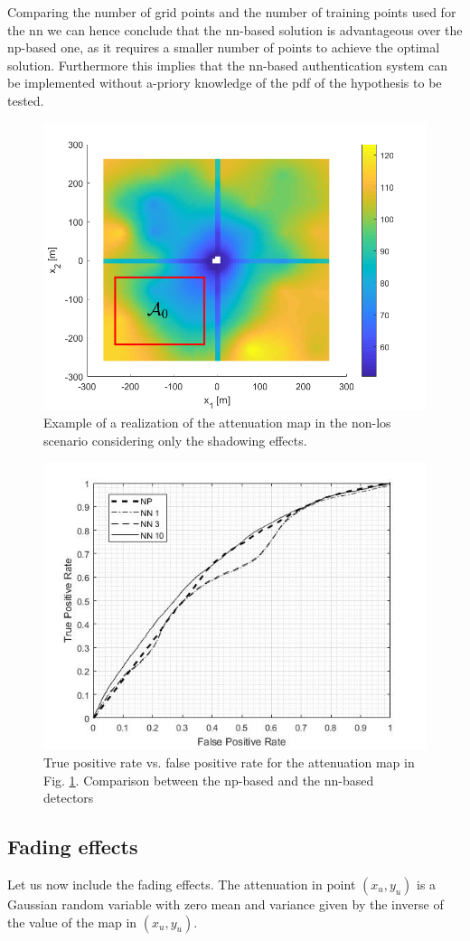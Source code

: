 \documentclass[draftcls,onecolumn,12pt]{IEEEtran}
\begin{document}
Comparing the number of grid points and the number of training points used for the \ac{nn} we can hence conclude that the \ac{nn}-based solution is advantageous over the \ac{np}-based one, as it requires a smaller number of points to achieve the optimal solution. Furthermore this implies that the \ac{nn}-based authentication system can be implemented without a-priory knowledge of the \ac{pdf} of the hypothesis to be tested.

\begin{figure}
    \centering
    \includegraphics[width=0.5\columnwidth]{surfColorato.png}
    \caption{Example of a realization of the attenuation map in the non-\ac{los} scenario considering only the shadowing effects.}
    \label{fig:map}
\end{figure}


\begin{figure}
    \centering
    \includegraphics[width=0.5\columnwidth]{true_map.jpg}
    \caption{True positive rate vs. false positive rate for the attenuation map in Fig. \ref{fig:map}. Comparison between the \ac{np}-based and the \ac{nn}-based detectors}
    \label{fig:trueMap}
\end{figure}

\subsection{Fading effects}
Let us now include the fading effects. The attenuation in point $(x_u,y_u)$ is a Gaussian random variable with zero mean and variance given by the inverse of the value of the map in $(x_u,y_u)$.
\end{document}
